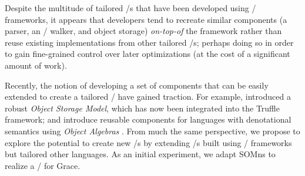 Despite the multitude of tailored \VM/s that have been developed using \VM/ frameworks, it appears that developers tend to recreate similar components (a parser, an \AST/ walker, and object storage) \emph{on-top-of} the framework rather than reuse existing implementations from other tailored \VM/s; perhaps doing so in order to gain fine-grained control over later optimizations (at the cost of a significant amount of work).

Recently, the notion of developing a set of components that can be easily extended to create a tailored \VM/ have gained traction. For example,  introduced a robust \emph{Object Storage Model}, which has now been integrated into the Truffle framework; and  introduce reusable components for languages with denotational semantics using \emph{Object Algebras} . From much the same perspective, we propose to explore the potential to create new \VM/s by extending \VM/s built using \VM/ frameworks but tailored other languages. As an initial experiment, we adapt SOMns to realize a \VM/ for Grace.


%




%





